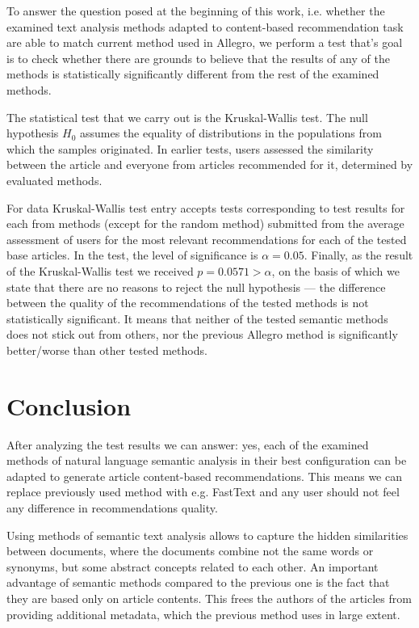 \documentclass[twoside,twocolumn]{article}
\begin{document}
	To answer the question posed at the beginning of this work, i.e. whether the examined text analysis methods adapted to content-based recommendation task are able to match current method used in Allegro, we perform a test that's goal is to check whether there are grounds to believe that the results of any of the methods is statistically significantly different from the rest of the examined methods.
		
	The statistical test that we carry out is the Kruskal-Wallis test. The null hypothesis $H_0$ assumes the equality of distributions in the populations from which the samples originated.
	In earlier tests, users assessed the similarity between the article and everyone from articles recommended for it, determined by evaluated methods.
	
	For data Kruskal-Wallis test entry accepts tests corresponding to test results for each from methods (except for the random method) submitted from the average assessment of users for the most relevant recommendations for each of the tested base articles.
	In the test, the level of significance is $\alpha = 0.05$. Finally, as the result of the Kruskal-Wallis test we received $p = 0.0571>\alpha$, on the basis of which we state that there are no reasons to	reject the null hypothesis --- the difference between the quality of the recommendations of the tested methods is not statistically significant. It means that neither of the tested semantic methods does not stick out from others, nor the previous Allegro method is significantly better/worse than other tested methods.
	
	\section{Conclusion}
	
	After analyzing the test results we can answer: yes, each of the examined methods of natural language semantic analysis in their best configuration can be adapted to generate article content-based recommendations. This means we can replace previously used method with e.g. FastText and any user should not feel any difference in recommendations quality.
	
	Using methods of semantic text analysis allows to capture the hidden similarities between documents, where the documents combine not the same words or synonyms, but some abstract concepts related to each other. An important advantage of semantic methods compared to the previous one is the fact that they are based only on article contents. This frees the authors of the articles from providing additional metadata, which the previous method uses in large extent.
	
\end{document}
